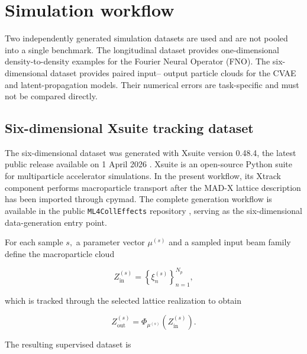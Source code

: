 
\chapter{Simulation workflow}
\label{sec:03_simulation_workflow_simulation_workflow}

Two independently generated simulation datasets are used and are not pooled into a single benchmark. The longitudinal dataset provides one-dimensional density-to-density examples for the Fourier Neural Operator (FNO). The six-dimensional dataset provides paired input– output particle clouds for the CVAE and latent-propagation models. Their numerical errors are task-specific and must not be compared directly.

\section{Six-dimensional Xsuite tracking dataset}
\label{sec:03_simulation_workflow_six_dimensional_xsuite_tracking_dataset}

The six-dimensional dataset was generated with Xsuite version 0.48.4, the latest public release available on 1 April 2026 \cite{xsuite2026documentation,iadarola2023xsuite}. Xsuite is an open-source Python suite for multiparticle accelerator simulations. In the present workflow, its Xtrack component performs macroparticle transport after the MAD-X lattice description has been imported through cpymad. The complete generation workflow is available in the public \texttt{ML4CollEffects} repository \cite{martinez2026code}, serving as the six-dimensional data-generation entry point.

For each sample \(s ,\) a parameter vector \(\mu^{( s )}\) and a sampled input beam family define the macroparticle cloud

\begin{equation}
\label{eq:34}
Z_{\mathrm{in}}^{(s)}=\left\{\xi_n^{(s)}\right\}_{n=1}^{N_p},
\end{equation}

which is tracked through the selected lattice realization to obtain

\begin{equation}
\label{eq:35}
Z_{\mathrm{out}}^{(s)}=\Phi_{\mu^{(s)}}\left(Z_{\mathrm{in}}^{(s)}\right).
\end{equation}

The resulting supervised dataset is


